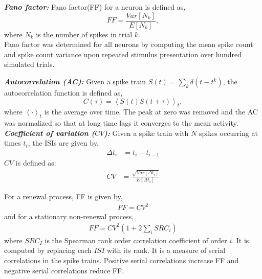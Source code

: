\textbf{\textit{Fano factor:}}
Fano factor(FF) for a neuron is defined as,\\
\begin{equation}
FF = \frac{Var[N_{k}]}{E[N_{k}]},
\end{equation}
where $N_{k}$ is the number of spikes in trial $k$. \\
Fano factor was determined for all neurons by computing the mean spike count and spike count variance upon repeated stimulus presentation over hundred simulated trials.

\textbf{\textit{Autocorrelation (AC):}}
Given a spike train $S(t) = \sum_{k} \delta(t - t^k)$, the 
autocorrelation function is defined as, \\
\begin{equation}
C(\tau) = \left\langle S(t) S(t + \tau) \right\rangle _ {t},
\end{equation}
where $\left\langle \cdot \right\rangle _ {t}$ is the average over time. The peak at zero was removed and the AC was normalized so that at long time lags it converges to the mean activity. \\


\textbf{\textit{Coefficient of variation ($CV$):}}
Given a spike train with $N$ spikes occurring at times $t_{i}$, the ISIs are given by, \\
\begin{align}
\Delta t_{i} &= t_{i} - t_{i-1}
\end{align}
$CV$ is defined as: \\
\begin{align}
CV &= \frac{\sqrt{Var[\Delta t_{i}]}}{E[\Delta t_{i}]}
\end{align}

For a renewal process, FF is given by, 
\begin{align}
FF = CV^{2}
\end{align}
and for a stationary non-renewal process, 
\begin{align}
FF = CV^{2} (1 + 2 \sum_{i} SRC_{i})
\label{ffcveq}
\end{align}
where $SRC_I$ is the Spearman rank order correlation coefficient of order $i$. It is computed by replacing each $ISI$ with its rank. It is a measure of serial correlations in the spike trains. Positive serial correlations increase FF and negative serial correlations reduce FF.   

